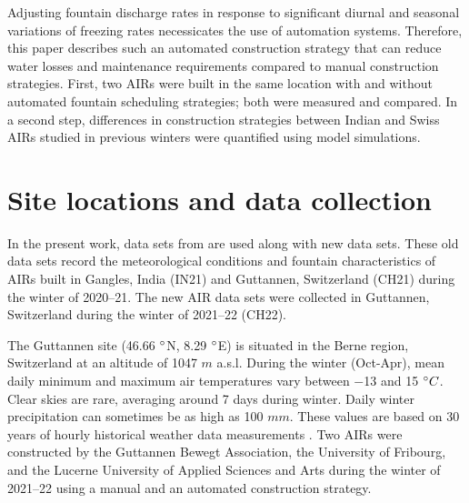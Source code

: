 \documentclass[tc, manuscript]{copernicus}
\begin{document}
Adjusting fountain discharge rates in response to significant diurnal and seasonal variations of freezing rates
necessicates the use of automation systems. Therefore, this paper describes such an automated construction strategy
that can reduce water losses and maintenance requirements compared to manual construction strategies. First, two
AIRs were built in the same location with and without automated fountain scheduling strategies; both were
measured and compared. In a second step, differences in construction strategies between Indian and Swiss AIRs
studied in previous winters were quantified using model simulations. 



\section{Site locations and data collection}

In the present work, data sets from \citet{balasubramanianInfluenceMeteorologicalConditions2022} are used along
with new data sets. These old data sets record the meteorological conditions and fountain characteristics of
AIRs built in Gangles, India (IN21) and Guttannen, Switzerland (CH21) during the winter of 2020--21. The new AIR
data sets were collected in Guttannen, Switzerland during the winter of 2021--22 (CH22).

The Guttannen site (46.66 $^{\circ}$N, 8.29 $^{\circ}$E) is situated in the Berne region, Switzerland at an
altitude of 1047 $m$ a.s.l. During the winter (Oct-Apr), mean daily minimum and maximum air temperatures vary
between $-$13 and 15 $^{\circ} C$. Clear skies are rare, averaging around 7 days during winter. Daily winter
precipitation can sometimes be as high as 100 $mm$. These values are based on 30 years of hourly historical
weather data measurements \citep{meteoblueClimateGuttannen2021}. Two AIRs were constructed by the Guttannen
Bewegt Association, the University of Fribourg, and the Lucerne University of Applied Sciences and Arts during
the winter of 2021--22 using a manual and an automated construction strategy.
\end{document}
